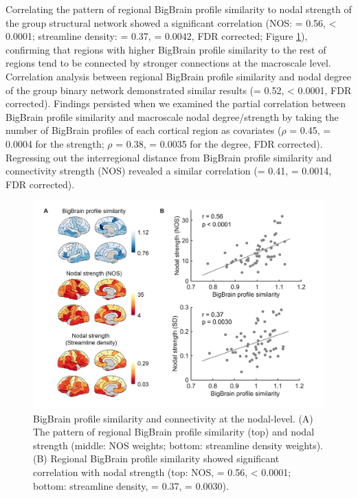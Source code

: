 \begin{refsection}
Correlating the pattern of regional BigBrain profile similarity to nodal strength of the group structural network showed a significant correlation (NOS: \rval = 0.56, \pval < 0.0001; streamline density: \rval = 0.37, \pval = 0.0042, FDR corrected; Figure \ref{bigbrainFig5}), confirming that regions with higher BigBrain profile similarity to the rest of regions tend to be connected by stronger connections at the macroscale level. Correlation analysis between regional BigBrain profile similarity and nodal degree of the group binary network demonstrated similar results (\rval = 0.52, \pval < 0.0001, FDR corrected). Findings persisted when we examined the partial correlation between BigBrain profile similarity and macroscale nodal degree/strength by taking the number of BigBrain profiles of each cortical region as covariates (\(\rho\) = 0.45, \pval = 0.0004 for the strength; \(\rho\) = 0.38, \pval = 0.0035 for the degree, FDR corrected). Regressing out the interregional distance from BigBrain profile similarity and connectivity strength (NOS) revealed a similar correlation (\rval = 0.41, \pval = 0.0014, FDR corrected).

\begin{figure}[h]
    \centering
    \includegraphics[width=\linewidth]{images/thesis_bb_fig5.jpg}
    \caption{BigBrain profile similarity and connectivity at the nodal-level. (A) The pattern of regional BigBrain profile similarity (top) and nodal strength (middle: NOS weights; bottom: streamline density weights). (B) Regional BigBrain profile similarity showed significant correlation with nodal strength (top: NOS, \rval = 0.56, \pval < 0.0001; bottom: streamline density, \rval = 0.37, \pval = 0.0030).}
    \label{bigbrainFig5}
\end{figure}


\end{refsection}
